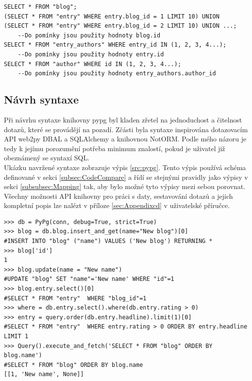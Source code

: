 \documentclass[ing,male,java,dept456]{diploma}						%
\begin{document}
\begin{lstlisting}[style=customsql, label=src:sql-selectin, caption={Dotazy vygenerované z výpisu \ref{src:imp-selectin} knihovnou pypg}]
SELECT * FROM "blog";
(SELECT * FROM "entry" WHERE entry.blog_id = 1 LIMIT 10) UNION  (SELECT * FROM "entry" WHERE entry.blog_id = 2 LIMIT 10) UNION ...; 
	--Do pomínky jsou použity hodnoty blog.id
SELECT * FROM "entry_authors" WHERE entry_id IN (1, 2, 3, 4...); 
	--Do pomínky jsou použity hodnoty entry.id
SELECT * FROM "author" WHERE id IN (1, 2, 3, 4...);
	--Do pomínky jsou použity hodnoty entry_authors.author_id
\end{lstlisting}

\subsection{Návrh syntaxe}

Při návrhu syntaxe knihovny pypg byl kladen zřetel na jednoduchost a čitelnost dotazů, které se provádějí na pozadí. Zčásti byla syntaxe inspirována dotazovacím API web2py DBAL a SQLAlchemy a knihovnou NotORM. Podle mého názoru je tedy k jejímu porozumění potřeba minimum znalostí, pokud je uživatel již obeznámený se syntaxí SQL. \\
Ukázku navržené syntaxe zobrazuje výpis \ref{src:pypg}. Tento výpis používá schéma definované v sekci \ref{subsec:CodeCompare} a řídí se stejnými pravidly jako výpisy v sekci \ref{subsubsec:Mapping} tak, aby bylo možné tyto výpisy mezi sebou porovnat. \\ 
Všechny možnosti API knihovny pro práci s daty, sestavování dotazů a jejich kompletní popis lze nalézt v příloze \ref{sec:Appendixcd} v uživatelské příručce.

\clearpage

\begin{lstlisting}[style=custompython, label=src:pypg, caption={Návrh syntaxe knihovny pypg}]
>>> db = PyPg(conn, debug=True, strict=True)
>>> blog = db.blog.insert_and_get(name="New blog")[0]
#INSERT INTO "blog" ("name") VALUES ('New blog') RETURNING *
>>> blog['id']
1
>>> blog.update(name = "New name")
#UPDATE "blog" SET "name"='New name' WHERE "id"=1 
>>> blog.entry.select()[0]
#SELECT * FROM "entry"  WHERE "blog_id"=1
>>> where = db.entry.select().where(db.entry.rating > 0)
>>> entry = query.order(db.entry.headline).limit(1)[0]
#SELECT * FROM "entry"  WHERE entry.rating > 0 ORDER BY entry.headline LIMIT 1
>>> Query().execute_and_fetch('SELECT * FROM "blog" ORDER BY blog.name')
#SELECT * FROM "blog" ORDER BY blog.name
[[1, 'New name', None]]
\end{lstlisting}
\end{document}
